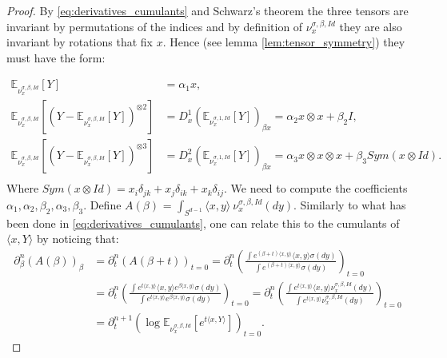 \documentclass{article}
\numberwithin{theorem}{section}
\begin{document}
\begin{proof}
By \eqref{eq:derivatives_cumulants} and Schwarz's theorem the three tensors are invariant by permutations of the indices and by definition of $\nu_x^{\sigma,\beta, Id}$ they are also invariant by rotations that fix $x$. Hence (see lemma \ref{lem:tensor_symmetry}) they must have the form:

\begin{equation}
\label{eq:tensor_repres}
\begin{aligned}
\mathbb{E}_{\nu_x^{\sigma, \beta,Id}}[Y] &=\alpha_1 x,\\
\mathbb{E}_{\nu_{x}^{\sigma,\beta,Id}}[\left(Y-\mathbb{E}_{\nu_{x}^{\sigma,\beta,Id}}[Y]\right)^{\otimes 2}]&=D^1_x\left(\mathbb{E}_{\nu_x^{\sigma, 1,Id}}[Y] \right)_{\beta x}=\alpha_2 x\otimes x + \beta_2 I,\\
  \mathbb{E}_{\nu_{x}^{\sigma,\beta,Id}}[\left(Y-\mathbb{E}_{\nu_{x}^{\sigma,\beta,Id}}[Y]\right)^{\otimes 3}]&=D^2_x \left(\mathbb{E}_{\nu_x^{\sigma, 1,Id}}[Y] \right)_{\beta x}=\alpha_3 x \otimes x \otimes x +\beta_3 Sym(x\otimes Id).\\
\end{aligned}
\end{equation}
Where $Sym(x\otimes Id)=x_i\delta_{jk}+x_j\delta_{ik}+x_k\delta_{ij}$.
We need to compute the coefficients $\alpha_1, \alpha_2,\beta_2, \alpha_3,\beta_3$. Define $A(\beta)$ = $\int_{S^{d-1}}  \langle x, y\rangle \ \nu_x^{\sigma,\beta,Id}(dy)$. Similarly to what has been done in \eqref{eq:derivatives_cumulants}, one can relate this to the cumulants of $\langle x, Y\rangle$ by noticing that:
\begin{align*}
\partial^{n}_\beta\left( A(\beta)\right)_{\beta}& = \partial^{n}_t\left( A(\beta+t)\right)_{t=0}=\partial_t^n\left(\frac{\int e^{(\beta+t)\langle x,y\rangle}\langle x,y\rangle \sigma(dy)}{\int e^{(\beta+t)\langle x,y\rangle}\sigma(dy)} \right)_{t=0}\\
&=\partial_t^n\left(\frac{\int e^{t\langle x,y\rangle}\langle x,y\rangle e^{\beta\langle x,y\rangle} \sigma(dy)}{\int e^{t\langle x,y\rangle}e^{\beta\langle x,y\rangle}\sigma(dy)} \right)_{t=0}=\partial_t^n\left(\frac{\int e^{t\langle x,y\rangle}\langle x,y\rangle  \nu_x^{\sigma, \beta, Id}(dy)}{\int e^{t\langle x,y\rangle}\nu_x^{\sigma, \beta, Id}(dy)} \right)_{t=0}\\
&=\partial^{n+1}_t\left( \log \mathbb{E}_{\nu_x^{\sigma,\beta, Id}}[e^{t\langle x, Y\rangle}]\right)_{t=0}.
\end{align*}


\end{proof}
\end{document}
